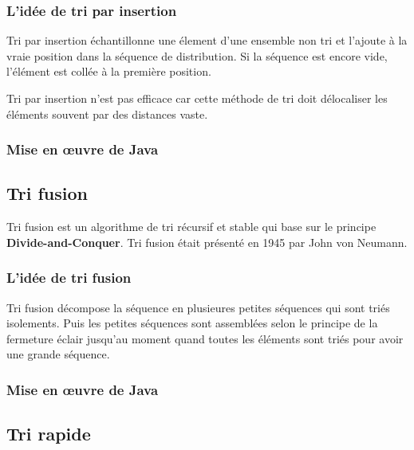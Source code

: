 \documentclass[11pt, a4paper, titlepage, twoside]{article}
\renewcommand{\emph}{\textbf}
\begin{document}
	\subsubsection{L'idée de tri par insertion}
	
	Tri par insertion échantillonne une élement d'une ensemble non tri et l'ajoute à la vraie position dans la séquence de distribution. Si la séquence est encore vide, l'élément est collée à la première position.
	
	Tri par insertion n'est pas efficace car cette méthode de tri doit délocaliser les éléments souvent par des distances vaste.
	
	\subsubsection{Mise en œuvre de Java}
	
	
	
	\subsection{Tri fusion}
	
	Tri fusion est un algorithme de tri récursif et stable qui base sur le principe \emph{Divide-and-Conquer}. Tri fusion était présenté en 1945 par John von Neumann.
	
	\subsubsection{L'idée de tri fusion}
	
	Tri fusion décompose la séquence en plusieures petites séquences qui sont triés isolements. Puis les petites séquences sont assemblées selon le principe de la fermeture éclair jusqu'au moment quand toutes les éléments sont triés pour avoir une grande séquence.
	
	\subsubsection{Mise en œuvre de Java}
	
	
	
	\subsection{Tri rapide}
	
\end{document}
